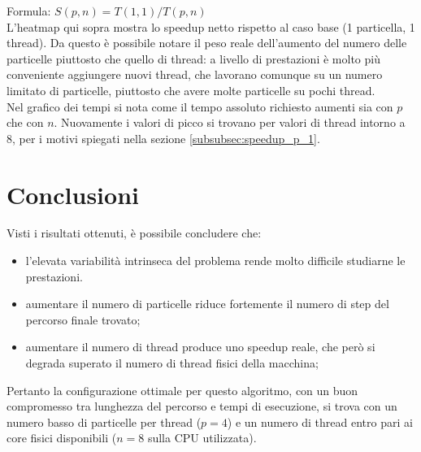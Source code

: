 \documentclass{article}
\begin{document}
\noindent Formula: $S(p,n) = T(1,1)/T(p,n)$\\
\noindent L'heatmap qui sopra mostra lo speedup netto rispetto al caso base (1 particella, 1 thread). Da questo è possibile notare il peso reale dell'aumento del numero delle particelle piuttosto che quello di thread: a livello di prestazioni è molto più conveniente aggiungere nuovi thread, che lavorano comunque su un numero limitato di particelle, piuttosto che avere molte particelle su pochi thread.\\
\noindent Nel grafico dei tempi si nota come il tempo assoluto richiesto aumenti sia con $p$ che con $n$.
\noindent Nuovamente i valori di picco si trovano per valori di thread intorno a 8, per i motivi spiegati nella sezione \ref{subsubsec:speedup_p_1}.

\section{Conclusioni}
Visti i risultati ottenuti, è possibile concludere che:
\begin{itemize}
    \item l'elevata variabilità intrinseca del problema rende molto difficile studiarne le prestazioni.
    \item aumentare il numero di particelle riduce fortemente il numero di step del percorso finale trovato;
    \item aumentare il numero di thread produce uno speedup reale, che però si degrada superato il numero di thread fisici della macchina;
\end{itemize}
\noindent Pertanto la configurazione ottimale per questo algoritmo, con un buon compromesso tra lunghezza del percorso e tempi di esecuzione, si trova con un numero basso di particelle per thread ($p=4$) e un numero di thread entro pari ai core fisici disponibili ($n=8$ sulla CPU utilizzata).
\end{document}
